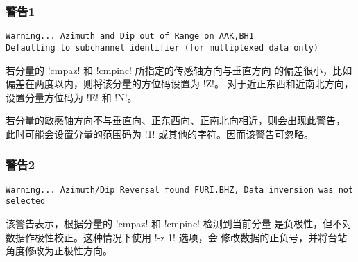 \subsubsection{警告1}
\begin{verbatim}
Warning... Azimuth and Dip out of Range on AAK,BH1
Defaulting to subchannel identifier (for multiplexed data only)
\end{verbatim}
若分量的 !cmpaz! 和 !cmpinc! 所指定的传感轴方向与垂直方向
的偏差很小，比如偏差在两度以内，则将该分量的方位码设置为 !Z!。
对于近正东西和近南北方向，设置分量方位码为 !E! 和 !N!。

若分量的敏感轴方向不与垂直向、正东西向、正南北向相近，则会出现此警告，
此时可能会设置分量的范围码为 !1! 或其他的字符。因而该警告可忽略。

\subsubsection{警告2}
\begin{verbatim}
Warning... Azimuth/Dip Reversal found FURI.BHZ, Data inversion was not selected
\end{verbatim}
该警告表示，根据分量的 !cmpaz! 和 !cmpinc! 检测到当前分量
是负极性，但不对数据作极性校正。这种情况下使用 !-z 1! 选项，会
修改数据的正负号，并将台站角度修改为正极性方向。
